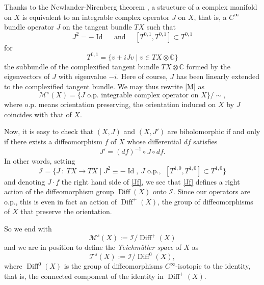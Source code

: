\documentclass[JEP,XML,SOM,Unicode]{cedram}
\let\mathcal\mathscr
\DeclareMathOperator{\Diff}{Diff}
\DeclareMathOperator{\Id}{Id}
\theoremstyle{plain}
\theoremstyle{definition}
\theoremstyle{remark}
\numberwithin{equation}{section}
\newcommand{\CC}{{\mathbb{C}}}
\newcommand{\cI}{\mathcal{I}}
\begin{document}
Thanks to the Newlander-Nirenberg theorem \cite{NN}, a structure of a complex manifold on $X$ is equivalent to an integrable complex operator $J$ on $X$, that is, a $C^\infty$ bundle operator $J$ on the tangent bundle $TX$ such that
\begin{equation}
\label{ico}
J^2=- \Id\quad\text{ and }\quad [T^{0,1},T^{0,1}]\subset T^{0,1}
\end{equation}
for
\begin{equation}
\label{T01}
T^{0,1}=\{v+iJv\mid v\in TX\otimes\CC\}
\end{equation}
the subbundle of the complexified tangent bundle $TX\otimes\CC$ formed by the eigenvectors of $J$ with eigenvalue $-i$. Here of course, $J$ has been linearly extended to the complexified tangent bundle. We may thus rewrite \eqref{M} as
\begin{equation}
\label{M2}
\mathcal M^s(X)=\{J\text{ o.p. integrable complex operator on } X\}/\sim,
\end{equation}
where o.p. means orientation preserving, \ie the orientation induced on $X$ by $J$ coincides with that of $X$.

Now, it is easy to check that $(X,J)$ and $(X,J')$ are biholomorphic if and only if there exists a diffeomorphism $f$ of $X$ whose differential $df$ satisfies
\begin{equation}
\label{Jf}
J'=(df)^{-1}\circ J\circ df.
\end{equation}
In other words, setting
\begin{equation}
\label{I}
\cI=\{J\ :\ TX\longrightarrow TX\mid J^2\equiv -\Id,\ J\text{ o.p.},\ \ [T^{1,0}, T^{1,0}]\subset T^{1,0}\}
\end{equation}
and denoting $J\cdot f$ the right hand side of \eqref{Jf}, we see that \eqref{Jf} defines a right action of the diffeomorphism group $\Diff(X)$ onto $\cI$. Since our operators are o.p., this is even in fact an action of $\Diff^+(X)$, the group of diffeomorphisms of $X$ that preserve the orientation.

So we end with
\begin{equation}
\label{Riem}
\mathcal M^s(X):=\cI\big /\Diff^+(X)
\end{equation}
and we are in position to define the \emph{Teichmüller space} of $X$ as
\begin{equation}
\label{Teich}
\mathcal T^s(X):=\cI\big /\Diff^0(X),
\end{equation}
where $\Diff^0(X)$ is the group of diffeomorphisms $C^\infty$-isotopic to the identity, that is, the connected component of the identity in $\Diff^+(X)$.
\end{document}
